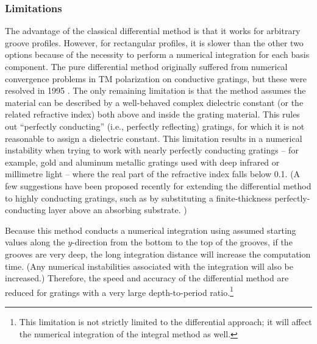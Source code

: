 \documentclass[singlespace,proposal]{uofsthesis-cs}
\begin{document}
\subsubsection{Limitations}
The advantage of the classical differential method is that it works for arbitrary groove profiles.  However, for rectangular profiles, it is slower than the other two options because of the necessity to perform a numerical integration for each basis component.  The pure differential method originally suffered from numerical convergence problems in TM polarization on conductive gratings, but these were resolved in 1995 \cite{Li96} \cite{Li96b} \cite{Pop00}.  The only remaining limitation is that the method assumes the material can be described by a well-behaved complex dielectric constant (or the related refractive index) both above and inside the grating material.  This rules out ``perfectly conducting'' (i.e., perfectly reflecting) gratings, for which it is not reasonable to assign a dielectric constant.  This limitation results in a numerical instability when trying to work with nearly perfectly conducting gratings -- for example, gold and aluminum metallic gratings used with deep infrared or millimetre light -- where the real part of the refractive index falls below 0.1.  (A few suggestions have been proposed recently for extending the differential method to highly conducting gratings, such as by substituting a finite-thickness perfectly-conducting layer above an absorbing substrate. \cite{Pop04})

Because this method conducts a numerical integration using assumed starting values along the $y$-direction from the bottom to the top of the grooves, if the grooves are very deep, the long integration distance will increase the computation time.  (Any numerical instabilities associated with the integration will also be increased.)  Therefore, the speed and accuracy of the differential method are reduced for gratings with a very large depth-to-period ratio.\footnote{This limitation is not strictly limited to the differential approach; it will affect the numerical integration of the integral method as well.}
\end{document}
